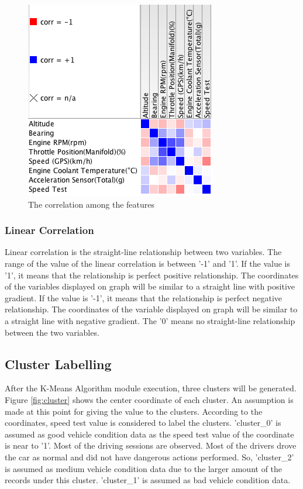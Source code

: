 \begin{figure}[hbt!]\centering
\includegraphics[height=.5\textwidth]{image/KNIMEcorrelation}
\caption{The correlation among the features}
\label{fig:correlation}
\end{figure}

\subsubsection{Linear Correlation}
Linear correlation is the straight-line relationship between two variables. The range of the value of the linear correlation is between '-1' and '1'. If the value is '1', it means that the relationship is perfect positive relationship. The coordinates of the variables displayed on graph will be similar to a straight line with positive gradient. If the value is '-1', it means that the relationship is perfect negative relationship. The coordinates of the variable displayed on graph will be similar to a straight line with negative gradient. The '0' means no straight-line relationship between the two variables.

\subsection{Cluster Labelling}
After the K-Means Algorithm module execution, three clusters will be generated. Figure \ref{fig:cluster} shows the center coordinate of each cluster. An assumption is made at this point for giving the value to the clusters. According to the coordinates, speed test value is considered to label the clusters. 'cluster\_0' is assumed as good vehicle condition data as the speed test value of the coordinate is near to '1'. Most of the driving sessions are observed. Most of the drivers drove the car as normal and did not have dangerous actions performed. So, 'cluster\_2' is assumed as medium vehicle condition data due to the larger amount of the records under this cluster. 'cluster\_1' is assumed as bad vehicle condition data.

